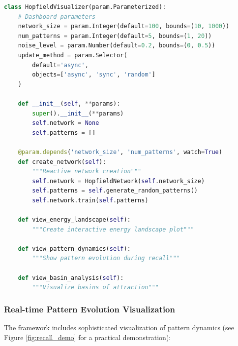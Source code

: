 \documentclass[11pt,a4paper]{article}
\begin{document}
\begin{lstlisting}[language=Python, caption=Interactive Dashboard Structure]
class HopfieldVisualizer(param.Parameterized):
    # Dashboard parameters
    network_size = param.Integer(default=100, bounds=(10, 1000))
    num_patterns = param.Integer(default=5, bounds=(1, 20))
    noise_level = param.Number(default=0.2, bounds=(0, 0.5))
    update_method = param.Selector(
        default='async', 
        objects=['async', 'sync', 'random']
    )
    
    def __init__(self, **params):
        super().__init__(**params)
        self.network = None
        self.patterns = []
        
    @param.depends('network_size', 'num_patterns', watch=True)
    def create_network(self):
        """Reactive network creation"""
        self.network = HopfieldNetwork(self.network_size)
        self.patterns = self.generate_random_patterns()
        self.network.train(self.patterns)
        
    def view_energy_landscape(self):
        """Create interactive energy landscape plot"""
        
    def view_pattern_dynamics(self):
        """Show pattern evolution during recall"""
        
    def view_basin_analysis(self):
        """Visualize basins of attraction"""
\end{lstlisting}

\subsubsection{Real-time Pattern Evolution Visualization}

The framework includes sophisticated visualization of pattern dynamics (see Figure \ref{fig:recall_demo} for a practical demonstration):
\end{document}
